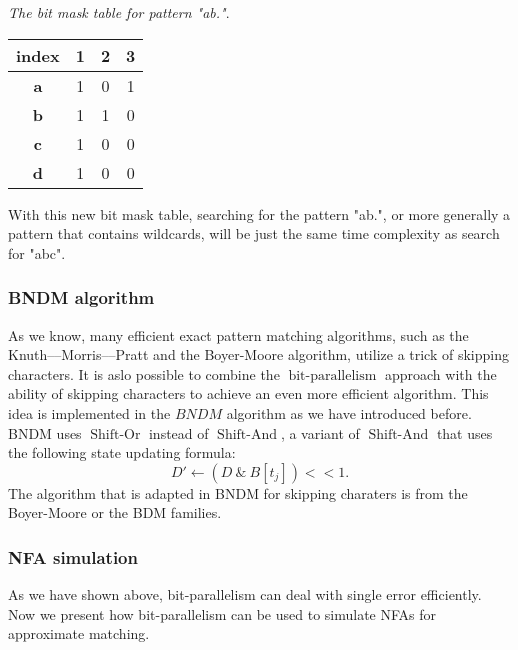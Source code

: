 \begin{example}\emph{The bit mask table for pattern "ab."}.
	\begin{table}[H]
		\centering
		\begin{tabular}{|c|c|c|c|}
			\hline
			index      & 1                        & 2                        & 3                        \\ \hline
			\textbf{a} & {\color{red} 1}                   & 0                        & {\color[HTML]{3531FF} 1} \\ \hline
			\textbf{b} &  {\color{red} 1}                    & {\color[HTML]{3531FF} 1} & 0                        \\ \hline
			\textbf{c} & {\color[HTML]{3531FF} 1} & 0                        & 0                        \\ \hline
			\textbf{d} &{\color{red} 1}                    & 0                        & 0                        \\ \hline
		\end{tabular}
		\label{table-bitmask2}
	\end{table}
\end{example}

With this new bit mask table, searching for the pattern "ab.", or more generally a pattern that contains wildcards, will be just the same time complexity as search for "abc". 
 
\subsubsection{BNDM algorithm}
As we know, many efficient exact pattern matching algorithms, such as the Knuth--–Morris--–Pratt and the Boyer-Moore algorithm, utilize a trick of skipping characters. It is aslo possible to combine the $\operatorname{bit-parallelism}$ approach with the ability of skipping characters to achieve an even more efficient algorithm. This idea is implemented in the $BNDM$ algorithm as we have introduced before. BNDM uses $\operatorname{Shift-Or}$ instead of $\operatorname{Shift-And}$, a variant of $\operatorname{Shift-And}$ that uses the following state updating formula:  
$$ D' \leftarrow  (D \ \& \ B[t_j]) << 1 .$$ The algorithm that is adapted in BNDM for skipping charaters is from the Boyer-Moore or the BDM families\cite{crochemore1994text}.


\subsubsection{NFA simulation}
As we have shown above, bit-parallelism can deal with single error efficiently.
Now we present how bit-parallelism can be used to simulate NFAs for approximate matching. 

